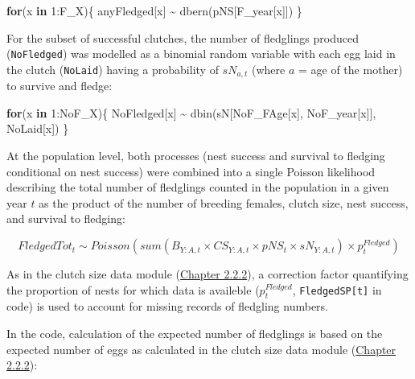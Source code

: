 \documentclass[
]{book}
\newenvironment{Shaded}{\begin{snugshade}}{\end{snugshade}}
\newcommand{\ControlFlowTok}[1]{\textcolor[rgb]{0.13,0.29,0.53}{\textbf{#1}}}
\newcommand{\DecValTok}[1]{\textcolor[rgb]{0.00,0.00,0.81}{#1}}
\newcommand{\FunctionTok}[1]{\textcolor[rgb]{0.00,0.00,0.00}{#1}}
\newcommand{\NormalTok}[1]{#1}
\newcommand{\SpecialCharTok}[1]{\textcolor[rgb]{0.00,0.00,0.00}{#1}}
\begin{document}
\begin{Shaded}
\begin{Highlighting}[]
\ControlFlowTok{for}\NormalTok{(x }\ControlFlowTok{in} \DecValTok{1}\SpecialCharTok{:}\NormalTok{F\_X)\{}
\NormalTok{  anyFledged[x] }\SpecialCharTok{\textasciitilde{}} \FunctionTok{dbern}\NormalTok{(pNS[F\_year[x]])}
\NormalTok{\}}
\end{Highlighting}
\end{Shaded}

For the subset of successful clutches, the number of fledglings produced
(\texttt{NoFledged}) was modelled as a binomial random variable with each egg laid in
the clutch (\texttt{NoLaid}) having a probability of \(sN_{a,t}\) (where \(a\) = age of the
mother) to survive and fledge:

\begin{Shaded}
\begin{Highlighting}[]
\ControlFlowTok{for}\NormalTok{(x }\ControlFlowTok{in} \DecValTok{1}\SpecialCharTok{:}\NormalTok{NoF\_X)\{}
\NormalTok{    NoFledged[x] }\SpecialCharTok{\textasciitilde{}} \FunctionTok{dbin}\NormalTok{(sN[NoF\_FAge[x], NoF\_year[x]], NoLaid[x])}
\NormalTok{\}}
\end{Highlighting}
\end{Shaded}

At the population level, both processes (nest success and survival to fledging
conditional on nest success) were combined into a single Poisson
likelihood describing the total number of fledglings counted in the population
in a given year \(t\) as the product of the number of breeding females, clutch
size, nest success, and survival to fledging:

\begin{equation}
FledgedTot_t  \sim Poisson(sum(B_{Y:A,t}\times CS_{Y:A,t}\times pNS_t\times sN_{Y:A,t}) \times p_t^{Fledged})
\end{equation}

As in the clutch size data module (\protect\hyperlink{ux5cux23ux5cux23ux5cux2520Clutchux5cux2520sizeux5cux2520dataux5cux2520likelihoods}{Chapter 2.2.2}),
a correction factor quantifying the proportion of nests for which data is
availeble (\(p_t^{Fledged}\), \texttt{FledgedSP{[}t{]}} in code) is used to account for
missing records of fledgling numbers.

In the code, calculation of the expected number of fledglings is based on the
expected number of eggs as calculated in the clutch size data module
(\protect\hyperlink{ux5cux23ux5cux23ux5cux2520Clutchux5cux2520sizeux5cux2520dataux5cux2520likelihoods}{Chapter 2.2.2}):
\end{document}

